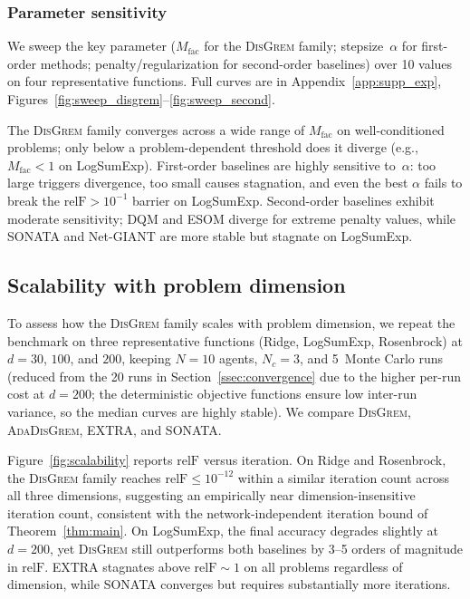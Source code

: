 \documentclass[review,onefignum,onetabnum]{siamart171218}
\begin{document}
	\subsubsection{Parameter sensitivity}
	
	We sweep the key parameter ($M_{\mathrm{fac}}$ for the
	\textsc{DisGrem} family; stepsize~$\alpha$ for first-order methods;
	penalty/regularization for second-order baselines) over 10 values
	on four representative functions.
	Full curves are in Appendix~\ref{app:supp_exp},
	Figures~\ref{fig:sweep_disgrem}--\ref{fig:sweep_second}.
	
	The \textsc{DisGrem} family converges across a wide range of
	$M_{\mathrm{fac}}$ on well-conditioned problems; only below a
	problem-dependent threshold does it diverge (e.g., $M_{\mathrm{fac}}{<}1$
	on LogSumExp).
	First-order baselines are highly sensitive to~$\alpha$: too large
	triggers divergence, too small causes stagnation, and even the
	best $\alpha$ fails to break the $\mathrm{relF}>10^{-1}$ barrier on
	LogSumExp.
	Second-order baselines exhibit moderate sensitivity; DQM and ESOM
	diverge for extreme penalty values, while SONATA and Net-GIANT are
	more stable but stagnate on LogSumExp.
	
	\FloatBarrier
	
	\subsection{Scalability with problem dimension}\label{ssec:scalability}
	
	To assess how the \textsc{DisGrem} family scales with problem
	dimension, we repeat the benchmark on three representative functions
	(Ridge, LogSumExp, Rosenbrock) at $d=30$, $100$, and $200$, keeping
	$N=10$ agents, $N_c=3$, and 5~Monte Carlo runs
	(reduced from the 20 runs in Section~\ref{ssec:convergence}
	due to the higher per-run cost at $d{=}200$;
	the deterministic objective functions ensure low inter-run variance,
	so the median curves are highly stable).
	We compare \textsc{DisGrem}, \textsc{AdaDisGrem}, EXTRA, and SONATA.
	
	Figure~\ref{fig:scalability} reports $\mathrm{relF}$ versus iteration.
	On Ridge and Rosenbrock, the \textsc{DisGrem} family reaches
	$\mathrm{relF}\le 10^{-12}$ within a similar iteration count across
	all three dimensions, suggesting an empirically near dimension-insensitive
	iteration count, consistent with the network-independent iteration bound
	of Theorem~\ref{thm:main}.
	On LogSumExp, the final accuracy degrades slightly at $d=200$, yet
	\textsc{DisGrem} still outperforms both baselines by 3--5 orders
	of magnitude in $\mathrm{relF}$.
	EXTRA stagnates above $\mathrm{relF}\sim 1$ on all problems
	regardless of dimension, while SONATA converges but requires
	substantially more iterations.
	
\end{document}
